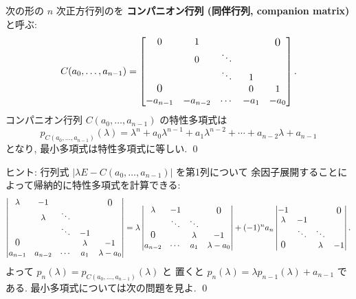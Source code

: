 \documentclass[12pt,twoside]{jarticle}
\begin{document}
\begin{question}[コンパニオン行列]
\label{q:minimal-polyn-10}
  次の形の $n$ 次正方行列のを {\bf コンパニオン行列 (同伴行列, 
  companion matrix)} と呼ぶ:
  \begin{equation*}
    C(a_0,\dots,a_{n-1}) =
    \begin{bmatrix}
      0         &    1     &        &      & \bigzerou \\
                &    0     & \ddots &      & \\
                &          & \ddots &  1   & \\
      \bigzerol &          &        &  0   &  1 \\
      -a_{n-1}  & -a_{n-2} & \cdots & -a_1 & -a_0 \\
    \end{bmatrix}.
  \end{equation*}
  コンパニオン行列 $C(a_0,\dots,a_{n-1})$ の特性多項式は
  \begin{equation*}
    p_{C(a_0,\dots,a_{n-1})}(\lambda)
    = \lambda^n + a_0\lambda^{n-1} + a_1\lambda^{n-2}
    + \cdots + a_{n-2}\lambda + a_{n-1}
  \end{equation*}
  となり, 最小多項式は特性多項式に等しい.
  \qed
\end{question}

\noindent
ヒント: 行列式 $|\lambda E - C(a_0,\dots,a_{n-1})|$ を第1列について
余因子展開することによって帰納的に特性多項式を計算できる:
{\small
\begin{equation*}
  \begin{vmatrix}
    \lambda &   -1    &        &         & \bigzerou \\
            & \lambda & \ddots &         & \\
            &         & \ddots &    -1   & \\
    \bigzerol &       &        & \lambda & -1 \\
    a_{n-1} & a_{n-2} & \cdots & a_1     & \lambda-a_0 \\
  \end{vmatrix}
  =
  \lambda
  \begin{vmatrix}
    \lambda & -1     &         & \bigzerou \\
            & \ddots & \ddots  & \\
    \bigzerol &      & \lambda & -1 \\
    a_{n-2} & \cdots & a_1     & \lambda-a_0 \\
  \end{vmatrix}
  + (-1)^n a_n
  \begin{vmatrix}
    -1      &        &         & \bigzerou \\
    \lambda & -1     &         & \\
            & \ddots & \ddots  & \\
    \bigzerol &      & \lambda & -1 \\
  \end{vmatrix}.
\end{equation*}
}よって $p_n(\lambda) = p_{C(a_0,\dots,a_{n-1})}(\lambda)$ と
置くと $p_n(\lambda) = \lambda p_{n-1}(\lambda) + a_{n-1}$ である.
最小多項式については次の問題を見よ.
\qed
\end{document}
